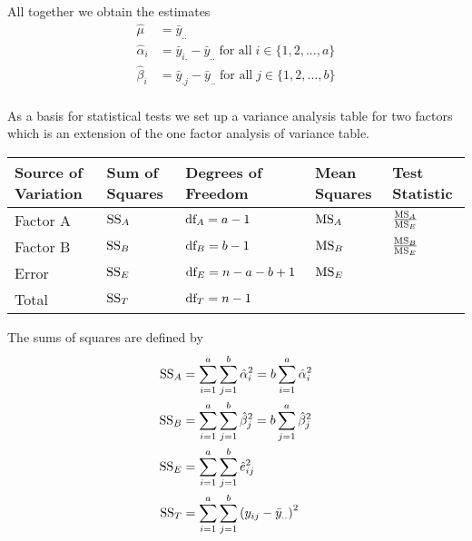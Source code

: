 All together we obtain the estimates
\begin{equation}
  \begin{split}
    \hat{\mu} &= \bar{y}_{..}\\
    \hat{\alpha}_i &= \bar{y}_{i.} - \bar{y}_{..} \;\text{for all}\; i \in \{1, 2, ..., a\}\\
    \hat{\beta}_i &= \bar{y}_{.j} - \bar{y}_{..}  \;\text{for all}\; j \in \{1, 2, ..., b\}\\
  \end{split}
\end{equation}

As a basis for statistical tests we set up a variance analysis table for two factors which is an extension
of the one factor analysis of variance table.
\begin{table}[H]
  \footnotesize
  \centering
  \begin{tabular}{ m{1.5cm} | m{1cm} l m{0.8cm} m{1.2cm}}
      Source of Variation  & Sum of Squares &  Degrees of Freedom & Mean Squares & Test Statistic \\ \hline
      Factor A   & $\textup{SS}_A$ & $\textup{df}_A = a-1$     & $\textup{MS}_A$ & $\frac{\textup{MS}_A}{\textup{MS}_E}$\\
      Factor B   & $\textup{SS}_B$ & $\textup{df}_B = b-1$     & $\textup{MS}_B$ & $\frac{\textup{MS}_B}{\textup{MS}_E}$\\
      Error      & $\textup{SS}_E$ & $\textup{df}_E = n-a-b+1$ & $\textup{MS}_E$ & \\ \hline
      Total      & $\textup{SS}_T$ & $\textup{df}_T = n-1$     &                 &\\
  \end{tabular}
\end{table}
The sums of squares are defined by
\begin{equation}
  \begin{split}
    \textup{SS}_A &= \sum_{i=1}^a \sum_{j=1}^b \hat{\alpha}_i^2 = b \sum_{i=1}^a \hat{\alpha}_i^2\\
    \textup{SS}_B &= \sum_{i=1}^a \sum_{j=1}^b \hat{\beta}_j^2 = b \sum_{j=1}^a \hat{\beta}_j^2\\
    \textup{SS}_E &= \sum_{i=1}^a \sum_{j=1}^b \hat{e}_{ij}^2\\
    \textup{SS}_T &= \sum_{i=1}^a \sum_{j=1}^b \left(y_{ij} - \bar{y}_{..}\right)^2
  \end{split}
\end{equation}

